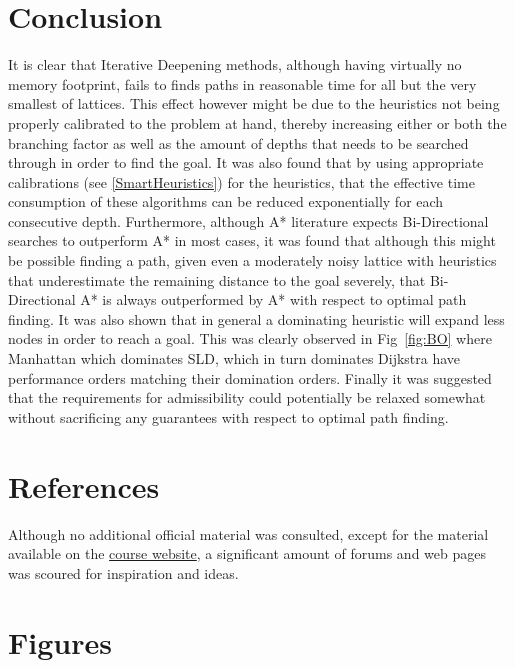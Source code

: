 \documentclass[conference]{IEEEtran}
\begin{document}
\section{Conclusion}
It is clear that Iterative Deepening methods, although having virtually no memory footprint, fails to finds paths in reasonable time for all but the very smallest of lattices. This effect however might be due to the heuristics not being properly calibrated to the problem at hand, thereby increasing either or both the branching factor as well as the amount of depths that needs to be searched through in order to find the goal. It was also found that by using appropriate calibrations (see \ref{SmartHeuristics}) for the heuristics, that the effective time consumption of these algorithms can be reduced exponentially for each consecutive depth. Furthermore, although A* literature expects Bi-Directional searches to outperform A* in most cases, it was found that although this might be possible finding a path, given even a moderately noisy lattice with heuristics that underestimate the remaining distance to the goal severely, that Bi-Directional A* is always outperformed by A* with respect to optimal path finding. It was also shown that in general a dominating heuristic will expand less nodes in order to reach a goal. This was clearly observed in Fig~\ref{fig:BO} where Manhattan which dominates SLD, which in turn dominates Dijkstra have performance orders matching their domination orders. Finally it was suggested that the requirements for admissibility could potentially be relaxed somewhat without sacrificing any guarantees with respect to optimal path finding.

\section{References}
Although no additional official material was consulted, except for the material available on the \href{https://computer-science.pages.cs.sun.ac.za/search/website/#week-2}{course website}, a significant amount of forums and web pages was scoured for inspiration and ideas.

\newpage

\appendices

\section{Figures} 
\label{AppendixFigs}
\end{document}
